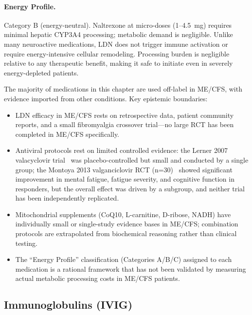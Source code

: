 \paragraph{Energy Profile.}
Category B (energy-neutral). Naltrexone at micro-doses (1--4.5~mg) requires minimal hepatic CYP3A4 processing; metabolic demand is negligible. Unlike many neuroactive medications, LDN does not trigger immune activation or require energy-intensive cellular remodeling. Processing burden is negligible relative to any therapeutic benefit, making it safe to initiate even in severely energy-depleted patients.

\begin{limitation}
The majority of medications in this chapter are used off-label in ME/CFS, with evidence imported from other conditions. Key epistemic boundaries:
\begin{itemize}
    \item LDN efficacy in ME/CFS rests on retrospective data, patient community reports, and a small fibromyalgia crossover trial---no large RCT has been completed in ME/CFS specifically.
    \item Antiviral protocols rest on limited controlled evidence: the Lerner 2007 valacyclovir trial~\cite{Lerner2007valacyclovir} was placebo-controlled but small and conducted by a single group; the Montoya 2013 valganciclovir RCT (n=30)~\cite{Montoya2013valganciclovir} showed significant improvement in mental fatigue, fatigue severity, and cognitive function in responders, but the overall effect was driven by a subgroup, and neither trial has been independently replicated.
    \item Mitochondrial supplements (CoQ10, L-carnitine, D-ribose, NADH) have individually small or single-study evidence bases in ME/CFS; combination protocols are extrapolated from biochemical reasoning rather than clinical testing.
    \item The ``Energy Profile'' classification (Categories A/B/C) assigned to each medication is a rational framework that has not been validated by measuring actual metabolic processing costs in ME/CFS patients.
\end{itemize}
\end{limitation}

\subsection{Immunoglobulins (IVIG)}

